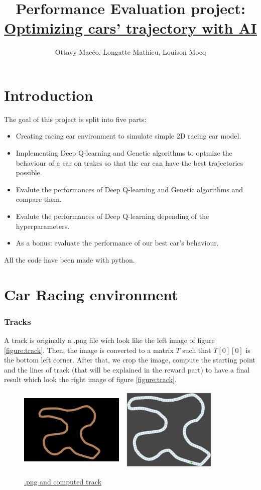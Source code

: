 \documentclass[11pt,a4paper]{article}
\title{\vspace{-1.0cm}Performance Evaluation project:\\\underline{Optimizing cars' trajectory with AI}}
\date{}
\author{\vspace{-1cm}Ottavy Macéo, Longatte Mathieu, Louison Mocq}
\newcounter{fig}
\newcommand{\mlist}[1]{\begin{itemize}[noitemsep,topsep=0pt]#1\end{itemize}}
\begin{document}
\maketitle

	\part{Introduction}
The goal of this project is split into five parts:
\mlist{
\item Creating racing car environment to simulate simple 2D racing car model.
\item Implementing Deep Q-learning and Genetic algorithms to optmize the behaviour of a car on trakcs so that the car can have the best trajectories possible.
\item Evalute the performances of Deep Q-learning and Genetic algorithms and compare them.
\item Evalute the performances of Deep Q-learning depending of the hyperparameters.
\item As a bonus: evaluate the performance of our best car's behaviour.
}
All the code have been made with python.

	\part{Car Racing environment}
		\section{Tracks}
A track is originally a .png file wich look like the left image of figure \ref{figure:track}. Then, the image is converted to a matrix $T$ such that $T[0][0]$ is the bottom left corner. After that, we crop the image, compute the starting point and the lines of track (that will be explained in the reward part) to have a final result which look the right image of figure \ref{figure:track}.
\begin{center}
\label{figure:track}
	\begin{figure}[ht]
		\centering
		\includegraphics[width=5cm, height=4cm]{track_06.png}
		\includegraphics[width=5cm, height=4cm]{track_06_computed.png}
		\caption{\underline{.png and computed track}}
	\end{figure}
\end{center}
\end{document}
